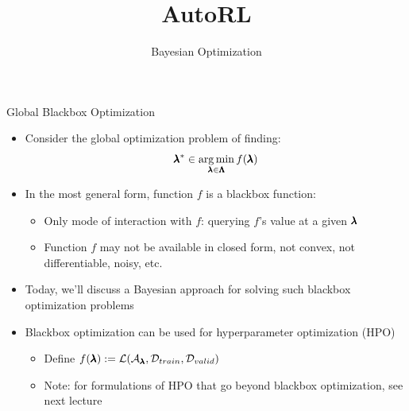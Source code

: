 \documentclass[aspectratio=169]{../latex_main/tntbeamer}  %
\title[Meta-RL]{AutoRL}
\subtitle{Bayesian Optimization}
\begin{document}
	
	\maketitle



\begin{frame}[c]{Global Blackbox Optimization}
    
    \begin{itemize}
        \item Consider the \alert{global optimization problem} of finding: 
        \[\pmb{\lambda}^* \in \operatorname*{arg\,min}_{\pmb{\lambda} \in \pmb{\Lambda}} f(\pmb{\lambda})\]
        
\pause
        \item In the most general form, function $f$ is a \alert{blackbox function}:
    	
    	\begin{center}
\scalebox{0.5}{}
    	\end{center}

    
   \begin{itemize}
    	\item Only mode of interaction with $f$: querying $f$'s value at a given $\pmb{\lambda}$ 
        \item Function $f$ may not be available in closed form, not convex, not differentiable, noisy, etc. 
   \end{itemize}
\medskip
\pause

        \item Today, we'll discuss a \alert{Bayesian} approach for solving such blackbox optimization problems
\medskip
\pause
        \item Blackbox optimization can be used for hyperparameter optimization (HPO)
   	 	\begin{itemize}
         	\item Define \alert{$f(\pmb{\lambda}) := \mathcal{L}( \mathcal{A}_{\pmb{\lambda}}, \mathcal{D}_{train}, \mathcal{D}_{valid} )$}
        	\item Note: for formulations of HPO that go beyond blackbox optimization, see next lecture
        \end{itemize}
    \end{itemize}
\end{frame}
\end{document}
